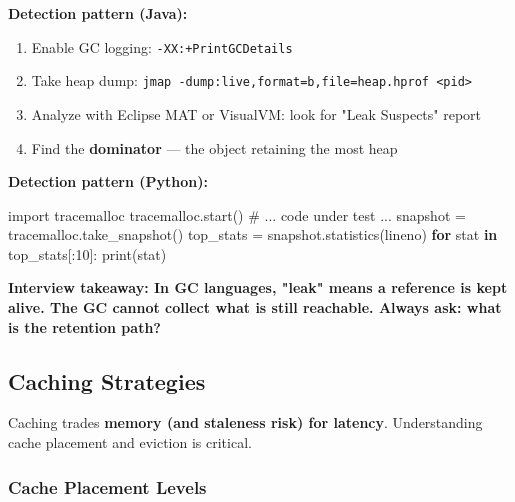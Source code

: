 \documentclass[11pt]{article}
\providecommand{\tightlist}{\setlength{\itemsep}{1pt}\setlength{\parskip}{0pt}}
\newenvironment{Shaded}{\begin{snugshade}}{\end{snugshade}}
\newcommand{\BuiltInTok}[1]{\textcolor[rgb]{0.50,0.55,0.55}{#1}}
\newcommand{\CommentTok}[1]{\textcolor[rgb]{0.48,0.49,0.49}{#1}}
\newcommand{\ControlFlowTok}[1]{\textcolor[rgb]{0.99,0.74,0.29}{\textbf{#1}}}
\newcommand{\DecValTok}[1]{\textcolor[rgb]{0.96,0.45,0.00}{#1}}
\newcommand{\ImportTok}[1]{\textcolor[rgb]{0.15,0.68,0.38}{#1}}
\newcommand{\KeywordTok}[1]{\textcolor[rgb]{0.81,0.81,0.76}{\textbf{#1}}}
\newcommand{\NormalTok}[1]{\textcolor[rgb]{0.81,0.81,0.76}{#1}}
\newcommand{\OperatorTok}[1]{\textcolor[rgb]{0.81,0.81,0.76}{#1}}
\newcommand{\StringTok}[1]{\textcolor[rgb]{0.96,0.31,0.31}{#1}}
\begin{document}
\textbf{Detection pattern (Java):}

\begin{enumerate}
\def\labelenumi{\arabic{enumi}.}
\tightlist
\item
  Enable GC logging: \texttt{-XX:+PrintGCDetails}
\item
  Take heap dump: \texttt{jmap\ -dump:live,format=b,file=heap.hprof\ \textless{}pid\textgreater{}}
\item
  Analyze with Eclipse MAT or VisualVM: look for "Leak Suspects" report
\item
  Find the \textbf{dominator} --- the object retaining the most heap
\end{enumerate}

\textbf{Detection pattern (Python):}


\begin{Shaded}
\begin{Highlighting}[]
\ImportTok{import}\NormalTok{ tracemalloc}
\NormalTok{tracemalloc.start()}
\CommentTok{\# ... code under test ...}
\NormalTok{snapshot }\OperatorTok{=}\NormalTok{ tracemalloc.take\_snapshot()}
\NormalTok{top\_stats }\OperatorTok{=}\NormalTok{ snapshot.statistics(}\StringTok{\textquotesingle{}lineno\textquotesingle{}}\NormalTok{)}
\ControlFlowTok{for}\NormalTok{ stat }\KeywordTok{in}\NormalTok{ top\_stats[:}\DecValTok{10}\NormalTok{]:}
    \BuiltInTok{print}\NormalTok{(stat)}
\end{Highlighting}
\end{Shaded}

\textbf{Interview takeaway: In GC languages, "leak" means a reference is kept alive. The GC cannot collect what is still reachable. Always ask: what is the retention path?}

\subsection{Caching Strategies}\label{caching-strategies}

Caching trades \textbf{memory (and staleness risk) for latency}. Understanding cache placement and eviction is critical.

\subsubsection{Cache Placement Levels}\label{cache-placement-levels}

\setcodelang{}
\end{document}
